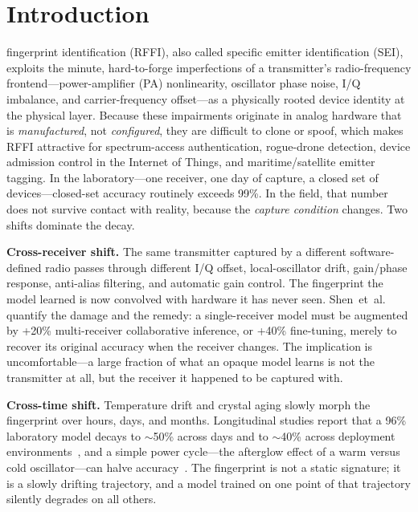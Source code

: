 \documentclass[journal]{IEEEtran}
\begin{document}
\section{Introduction}
\label{sec:intro}
 fingerprint identification (RFFI), also called specific emitter identification (SEI), exploits the minute, hard-to-forge imperfections of a transmitter's radio-frequency frontend---power-amplifier (PA) nonlinearity, oscillator phase noise, I/Q imbalance, and carrier-frequency offset---as a physically rooted device identity at the physical layer. Because these impairments originate in analog hardware that is \emph{manufactured}, not \emph{configured}, they are difficult to clone or spoof, which makes RFFI attractive for spectrum-access authentication, rogue-drone detection, device admission control in the Internet of Things, and maritime/satellite emitter tagging. In the laboratory---one receiver, one day of capture, a closed set of devices---closed-set accuracy routinely exceeds 99\%. In the field, that number does not survive contact with reality, because the \emph{capture condition} changes. Two shifts dominate the decay.

\textbf{Cross-receiver shift.} The same transmitter captured by a different software-defined radio passes through different I/Q offset, local-oscillator drift, gain/phase response, anti-alias filtering, and automatic gain control. The fingerprint the model learned is now convolved with hardware it has never seen. Shen~et~al.~\cite{shen2024} quantify the damage and the remedy: a single-receiver model must be augmented by +20\% multi-receiver collaborative inference, or +40\% fine-tuning, merely to recover its original accuracy when the receiver changes. The implication is uncomfortable---a large fraction of what an opaque model learns is not the transmitter at all, but the receiver it happened to be captured with.

\textbf{Cross-time shift.} Temperature drift and crystal aging slowly morph the fingerprint over hours, days, and months. Longitudinal studies report that a 96\% laboratory model decays to $\sim$50\% across days and to $\sim$40\% across deployment environments~\cite{quadar2024}, and a simple power cycle---the afterglow effect of a warm versus cold oscillator---can halve accuracy~\cite{alhazbi}. The fingerprint is not a static signature; it is a slowly drifting trajectory, and a model trained on one point of that trajectory silently degrades on all others.
\end{document}
